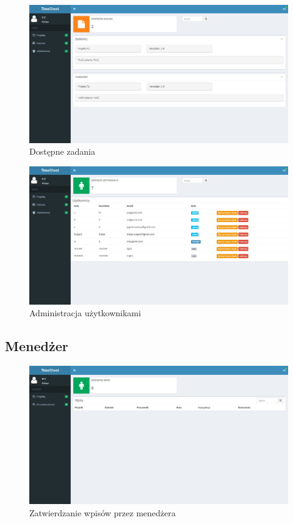 \documentclass[a4paper, 12pt, oneside]{article}
\begin{document}
		\begin{figure}[H]
			\includegraphics[width=16cm]{adminzadania.jpg}
			\caption{Dostępne zadania}
		\end{figure}
		
		\begin{figure}[H]
			\includegraphics[width=16cm]{adminuzytkownicy.jpg}
			\caption{Administracja użytkownikami}
		\end{figure}
		
		
				
		\subsection{Menedżer}
		
		\begin{figure}[H]
			\includegraphics[width=16cm]{managerdozatwierdzenia.jpg}
			\caption{Zatwierdzanie wpisów przez menedżera}
		\end{figure}
		
\end{document}
